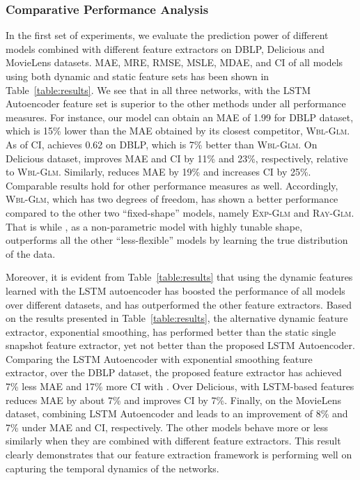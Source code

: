 \subsubsection{Comparative Performance Analysis}
In the first set of experiments, we evaluate the prediction power of different models combined with different feature extractors on DBLP, Delicious and MovieLens datasets. MAE, MRE, RMSE, MSLE, MDAE, and CI of all models using both dynamic and static feature sets has been shown in Table~\ref{table:results}. We see that in all three networks, \npglm with the LSTM Autoencoder feature set is superior to the other methods under all performance measures. For instance, our model \npglm can obtain an MAE of 1.99 for DBLP dataset, which is 15\% lower than the MAE obtained by its closest competitor, \textsc{Wbl-Glm}. As of CI, \npglm achieves 0.62 on DBLP, which is 7\% better than \textsc{Wbl-Glm}. On Delicious dataset, \npglm improves MAE and CI by 11\% and 23\%, respectively, relative to \textsc{Wbl-Glm}. Similarly, \npglm reduces MAE by 19\% and increases CI by 25\%. Comparable results hold for other performance measures as well. Accordingly, \textsc{Wbl-Glm}, which has two degrees of freedom, has shown a better performance compared to the other two ``fixed-shape'' models, namely \textsc{Exp-Glm} and \textsc{Ray-Glm}. That is while \npglm, as a non-parametric model with highly tunable shape, outperforms all the other ``less-flexible'' models by learning the true distribution of the data.

Moreover, it is evident from Table~\ref{table:results} that using the dynamic features learned with the LSTM autoencoder has boosted the performance of all models over different datasets, and has outperformed the other feature extractors. Based on the results presented in Table~\ref{table:results}, the alternative dynamic feature extractor, exponential smoothing, has performed better than the static single snapshot feature extractor, yet not better than the proposed LSTM Autoencoder. Comparing the LSTM Autoencoder with exponential smoothing feature extractor, over the DBLP dataset, the proposed feature extractor has achieved 7\% less MAE and 17\% more CI with \npglm. Over Delicious, \npglm with LSTM-based features reduces MAE by about 7\% and improves CI by 7\%. Finally, on the MovieLens dataset, combining LSTM Autoencoder and \npglm leads to an improvement of 8\% and 7\% under MAE and CI, respectively. The other models behave more or less similarly when they are combined with different feature extractors. This result clearly demonstrates that our feature extraction framework is performing well on capturing the temporal dynamics of the networks.

